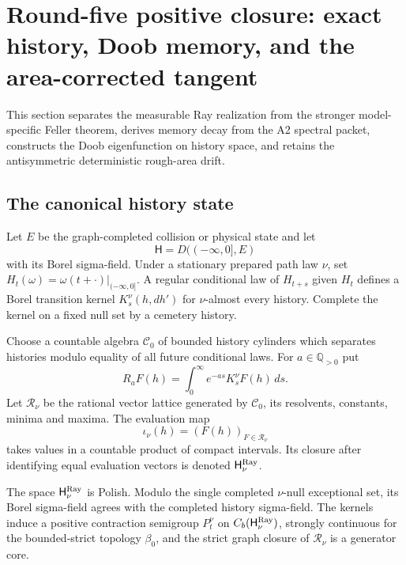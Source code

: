 \section{Round-five positive closure: exact history, Doob memory, and the area-corrected tangent}
\label{sec:r5-a4}

This section separates the measurable Ray realization from the stronger
model-specific Feller theorem, derives memory decay from the A2 spectral
packet, constructs the Doob eigenfunction on history space, and retains the
antisymmetric deterministic rough-area drift.

\subsection{The canonical history state}

Let \(E\) be the graph-completed collision or physical state and let
\[
 \mathsf H=D(( -\infty,0],E)
\]
with its Borel sigma-field.  Under a stationary prepared path law \(\nu\), set
\(H_t(\omega)=\omega(t+\cdot)|_{(-\infty,0]}\).  A regular conditional law of
\(H_{t+s}\) given \(H_t\) defines a Borel transition kernel
\(K_s^\nu(h,dh')\) for \(\nu\)-almost every history.  Complete the kernel on a
fixed null set by a cemetery history.

Choose a countable algebra \(\mathscr C_0\) of bounded history cylinders which
separates histories modulo equality of all future conditional laws.  For
\(a\in\mathbb Q_{>0}\) put
\[
 R_aF(h)=\int_0^\infty e^{-as}K_s^\nu F(h)\,ds.
\]
Let \(\mathscr R_\nu\) be the rational vector lattice generated by
\(\mathscr C_0\), its resolvents, constants, minima and maxima.  The evaluation
map
\[
 \iota_\nu(h)=(F(h))_{F\in\mathscr R_\nu}
\]
takes values in a countable product of compact intervals.  Its closure after
identifying equal evaluation vectors is denoted \(\mathsf H_\nu^{\rm Ray}\).

\begin{theorem}
\label{thm:r5-a4-ray}
The space \(\mathsf H_\nu^{\rm Ray}\) is Polish.  Modulo the single completed
\(\nu\)-null exceptional set, its Borel sigma-field agrees with the completed
history sigma-field.  The kernels induce a positive contraction semigroup
\(P_t^\nu\) on \(C_b(\mathsf H_\nu^{\rm Ray})\), strongly continuous for the
bounded-strict topology \(\beta_0\), and the strict graph closure of
\(\mathscr R_\nu\) is a generator core.
\end{theorem}

